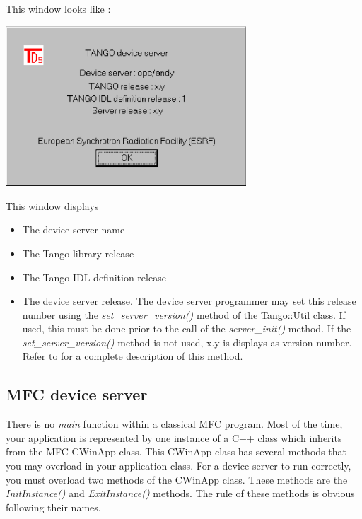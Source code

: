 This window looks like :

\vspace{0.3cm}


\begin{center}
\includegraphics[width=9cm]{ds_writing/nt_server/help}
\par\end{center}



\vspace{0.3cm}


This window displays 
\begin{itemize}
\item The device server name
\item The Tango library release
\item The Tango IDL definition release
\item The device server release. The device server programmer may set this
release number using the \emph{set\_server\_version()}
method of the Tango::Util class. If used, this must be
done prior to the call of the \emph{server\_init()} method. If the
\emph{set\_server\_version()} method is not used, x.y is displays
as version number. Refer to \cite{TANGO_ref_man} for a complete description
of this method.
\end{itemize}

\subsection{MFC device server}

There is no \emph{main} function within a classical MFC
program. Most of the time, your application is represented by one
instance of a C++ class which inherits from the MFC CWinApp class.
This CWinApp class has several methods that you may overload in your
application class. For a device server to run correctly, you must
overload two methods of the CWinApp class. These methods are the \emph{InitInstance()}
and \emph{ExitInstance()} methods. The rule of
these methods is obvious following their names.

